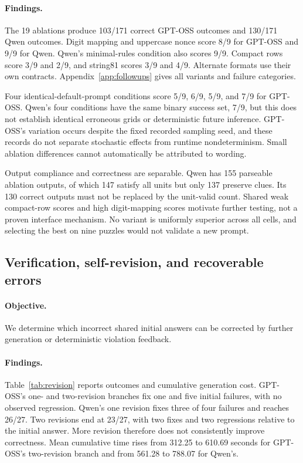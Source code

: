 \documentclass[11pt]{article}
\begin{document}
\paragraph{Findings.} The 19 ablations produce 103/171 correct GPT-OSS outcomes and 130/171 Qwen outcomes. Digit mapping and uppercase nonce score 8/9 for GPT-OSS and 9/9 for Qwen. Qwen's minimal-rules condition also scores 9/9. Compact rows score 3/9 and 2/9, and string81 scores 3/9 and 4/9. Alternate formats use their own contracts. Appendix~\ref{app:followups} gives all variants and failure categories.

Four identical-default-prompt conditions score 5/9, 6/9, 5/9, and 7/9 for GPT-OSS. Qwen's four conditions have the same binary success set, 7/9, but this does not establish identical erroneous grids or deterministic future inference. GPT-OSS's variation occurs despite the fixed recorded sampling seed, and these records do not separate stochastic effects from runtime nondeterminism. Small ablation differences cannot automatically be attributed to wording.

Output compliance and correctness are separable. Qwen has 155 parseable ablation outputs, of which 147 satisfy all units but only 137 preserve clues. Its 130 correct outputs must not be replaced by the unit-valid count. Shared weak compact-row scores and high digit-mapping scores motivate further testing, not a proven interface mechanism. No variant is uniformly superior across all cells, and selecting the best on nine puzzles would not validate a new prompt.

\subsection{Verification, self-revision, and recoverable errors}
\paragraph{Objective.} We determine which incorrect shared initial answers can be corrected by further generation or deterministic violation feedback.
\paragraph{Findings.} Table~\ref{tab:revision} reports outcomes and cumulative generation cost. GPT-OSS's one- and two-revision branches fix one and five initial failures, with no observed regression. Qwen's one revision fixes three of four failures and reaches 26/27. Two revisions end at 23/27, with two fixes and two regressions relative to the initial answer. More revision therefore does not consistently improve correctness. Mean cumulative time rises from 312.25 to 610.69 seconds for GPT-OSS's two-revision branch and from 561.28 to 788.07 for Qwen's.
\end{document}
